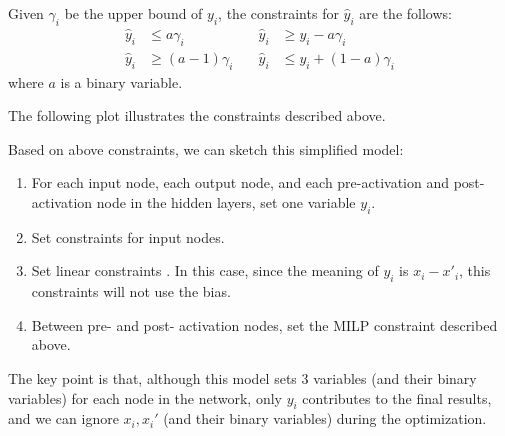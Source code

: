 \documentclass{llncs}
\begin{document}
	Given  $\gamma_i$ be the upper bound of $y_i$, the constraints for $\hat{y}_i$ are the follows:\begin{align*}
	\hat{y}_i &\leq a \gamma_i               &\quad \hat{y}_i &\geq y_i - a \gamma_i \\
	\hat{y}_i &\geq (a-1) \gamma_i           &\quad \hat{y}_i &\leq y_i + (1-a) \gamma_i
	\end{align*} where $a$ is a binary variable.
	
	
	The following plot illustrates the constraints described above.
	
	\hspace*{10ex}
	
   Based on above constraints, we can sketch this simplified model:
\begin{enumerate}
	\item For each input node, each output node, and each pre-activation and post-activation node in the hidden layers,  set one variable $y_i$. 
	\item Set constraints for input nodes.
	\item Set linear constraints . In this case, since the meaning of $y_i$ is $x_i-x'_i$, this constraints will not use the bias.
	\item Between pre- and post- activation nodes, set the MILP constraint described above.
\end{enumerate}
	
	The key point is that, although this model sets 3 variables (and their binary variables) for each node in the network, only $y_i$  contributes to the final results, and we can ignore $x_i,x_i'$ (and their binary variables) during the optimization.
	
\end{document}
